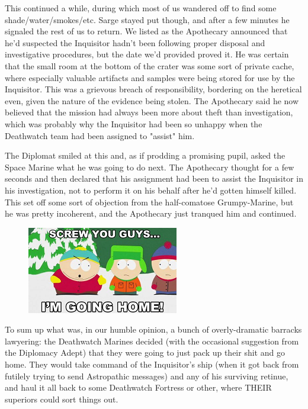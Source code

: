 This continued a while, during which most of us wandered off to find some shade/water/smokes/etc. 
Sarge stayed put though, and after a few minutes he signaled the rest of us to return. 
We listed as the Apothecary announced that he'd suspected the Inquisitor hadn't been following proper disposal and investigative procedures, but the date we'd provided proved it. 
He was certain that the small room at the bottom of the crater was some sort of private cache, where especially valuable artifacts and samples were being stored for use by the Inquisitor. 
This was a grievous breach of responsibility, bordering on the heretical even, given the nature of the evidence being stolen. 
The Apothecary said he now believed that the mission had always been  more about theft than investigation, which was probably why the Inquisitor had been so unhappy when the Deathwatch team had been assigned to "assist" him.

The Diplomat smiled at this and, as if prodding a promising pupil, asked the Space Marine what he was going to do next. 
The Apothecary thought for a few seconds and then declared that his assignment had been to assist the Inquisitor in his investigation, not to perform it on his behalf after he'd gotten himself killed. 
This set off some sort of objection from the half-comatose Grumpy-Marine, but he was pretty incoherent, and the Apothecary just tranqued him and continued.

\begin{figure}
	\begin{center}
		\includegraphics[width=\figwidth]{pics/16/66.png}
	\end{center}
\end{figure}
To sum up what was, in our humble opinion, a bunch of overly-dramatic barracks lawyering: 
the Deathwatch Marines decided (with the occasional suggestion from the Diplomacy Adept) that they were going to just pack up their shit and go home. 
They would take command of the Inquisitor's ship (when it got back from futilely trying to send Astropathic messages) and any of his surviving retinue, and haul it all back to some Deathwatch Fortress or other, where THEIR superiors could sort things out.


